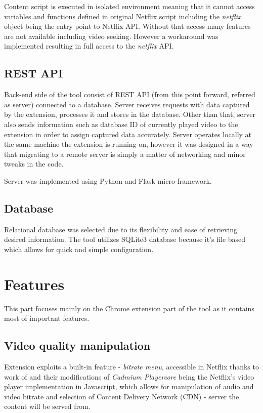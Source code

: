         Content script is executed in isolated environment meaning that it cannot access variables and functions defined in original Netflix script including the \textit{netflix} object being the entry point to Netflix API.
        Without that access many features are not available including video seeking.
        However a workaround was implemented resulting in full access to the \textit{netflix} API.
        
    \subsection{REST API}
        Back-end side of the tool consist of REST API (from this point forward, referred as server) connected to a database. Server receives requests with data captured by the extension, processes it and stores in the database. Other than that, server also sends information such as database ID of currently played video to the extension in order to assign captured data accurately.
        Server operates locally at the same machine the extension is running on, however it was designed in a way that migrating to a remote server is simply a matter of networking and minor tweaks in the code.
        
        Server was implemented using Python and Flask micro-framework.
    
    \subsection{Database}
        Relational database was selected due to its flexibility and ease of retrieving desired information. 
        The tool utilizes SQLite3 database because it's file based which allows for quick and simple configuration.



\section{Features}
\label{sec:Features}
    This part focuses mainly on the Chrome extension part of the tool as it contains most of important features.
    
    \subsection{Video quality manipulation}
        Extension exploits a built-in feature - \textit{bitrate menu}, accessible in Netflix thanks to work of \cite{netflix-1080p} and their modifications of \textit{Cadmium Playercore} being the Netflix's video player implementation in Javascript, which allows for manipulation of audio and video bitrate and selection of Content Delivery Network (CDN) - server the content will be served from. 
        
